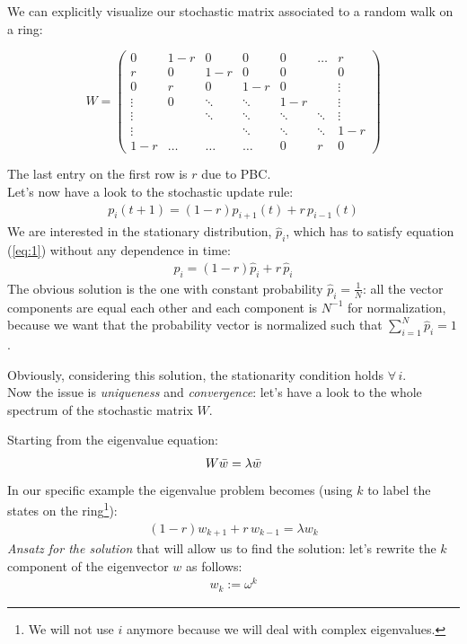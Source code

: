 \documentclass[\main/main.tex]{subfiles}
\begin{document}
We can explicitly visualize our stochastic matrix associated to a random walk on a ring:
\begin{center}
\[
W =
\begin{pmatrix}
0 & 1-r & 0 & 0 & 0 & \dots &r\\
r & 0 & 1-r & 0 & 0&  & 0 \\
0 & r & 0 & 1-r & 0 &  & \vdots \\
\vdots & 0 & \ddots & \ddots & 1-r & & \vdots\\
\vdots & &\ddots & \ddots & \ddots & \ddots &\vdots \\
\vdots & & & \ddots &\ddots & \ddots& 1-r \\
1-r & \dots & \dots& \dots& 0 & r & 0
\end{pmatrix}
\]
\end{center}

The last entry on the first row is $r$ due to PBC. \\

Let's now have a look to the stochastic update rule: 
\begin{eqnarray}
  p_i(t+1)=(1-r)p_{i+1}(t)+r\, p_{i-1}(t)
  \label{eq:1}
\end{eqnarray}
We are interested in the stationary distribution, $\hat{p}_i$, which has to satisfy equation (\ref{eq:1}) without any dependence in time:
\begin{align}
    \hat{p}_i=(1-r)\hat{p}_i + r\, \hat{p}_i
\end{align}
The obvious solution is the one with constant probability $\hat{p}_i=\frac{1}{N}$: all the vector components are equal each other and each component is $N^{-1}$ for normalization, because we want that the probability vector is normalized such that $\sum_{i=1}^N \hat{p}_i=1$.

Obviously, considering this solution, the stationarity condition holds $\forall \,i$. \\

Now the issue is \textit{uniqueness} and \textit{convergence}: let's have a look to the whole spectrum of the stochastic matrix $W$.

Starting from the eigenvalue equation:
\begin{eqnarray}
  W\Bar{w}=\lambda\Bar{w}
\end{eqnarray}
 In our specific example the eigenvalue problem becomes (using $k$ to label the states on the ring\footnote{We will not use $i$ anymore because we will deal with complex eigenvalues.}):
 \begin{eqnarray}
   (1-r)w_{k+1} + r\, w_{k-1}=\lambda w_k
   \label{eq:eGV}
 \end{eqnarray}
 \textit{Ansatz for the solution} that will allow us to find the solution: let's rewrite the $k$ component of the eigenvector $w$ as follows:
 \begin{align}
     w_k:=\omega^k
     \label{eq:ansatz}
 \end{align}
 
\end{document}
